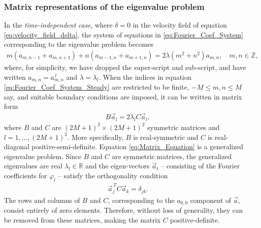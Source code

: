 \documentclass[11pt]{amsart}
\begin{document}
\subsubsection{Matrix representations of the eigenvalue problem}
%
In the \emph{time-independent case}, where $\delta=0$ in the velocity field
of equation \eqref{eq:velocity_field_delta}, the system of equations in
\eqref{eq:Fourier_Coef_System} corresponding to the eigenvalue problem
becomes 
%
\begin{align}\label{eq:Fourier_Coef_System_Steady}
  m(a_{m,n-1}+a_{m,n+1})+n(a_{m-1,n}+a_{m+1,n})=2\lambda(m^2+n^2)a_{m,n},
  \quad m,n\in\mathbb{Z},
\end{align}
%
where, for simplicity, we have dropped the super-script and
sub-script, and have written $a_{m,n}=a^{\,l}_{m,n}$ and
$\lambda=\lambda_l$. When the indices in equation
\eqref{eq:Fourier_Coef_System_Steady} are restricted to be finite,
$-M\leq m,n\leq M$ say, and suitable boundary conditions are imposed, it can
be written in matrix form   
%
\begin{align}\label{eq:Matrix_Equation}
  B\vec{a}_l=2\lambda_l C\vec{a}_l,
\end{align}
%
where $B$ and $C$ are $(2M+1)^2\times(2M+1)^2$ symmetric matrices and
$l=1,\ldots,(2M+1)^2$. More specifically, $B$ is real-symmetric and $C$ is
real-diagonal positive-semi-definite. Equation
\eqref{eq:Matrix_Equation} is a generalized eigenvalue problem. Since
$B$ and $C$ are symmetric matrices, the generalized eigenvalues are
real $\lambda_l\in\mathbb{R}$ and the eigen-vectors $\vec{a}_l$ -- consisting
of the Fourier coefficients for $\varphi_l$ -- satisfy the orthogonality
condition 
%
\begin{align}\label{eq:Matrix_Ortho}
  \vec{a}_j^{\,T}C\vec{a}_k=\delta_{jk}.
\end{align}
%
The rows and columns of $B$ and $C$, corresponding to the $a_{0,0}$
component of $\vec{a}$, consist entirely of zero elements. Therefore,
without loss of generality, they can be removed from these matrices,
making the matrix $C$ positive-definite. 
\end{document}
